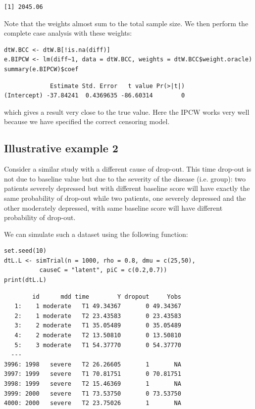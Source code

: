 \documentclass[12pt]{article}
\begin{document}
\begin{verbatim}
[1] 2045.06
\end{verbatim}


Note that the weights almost sum to the total sample size. We then
perform the complete case analysis with these weights:
\lstset{language=r,label= ,caption= ,captionpos=b,numbers=none}
\begin{lstlisting}
dtW.BCC <- dtW.B[!is.na(diff)]
e.BIPCW <- lm(diff~1, data = dtW.BCC, weights = dtW.BCC$weight.oracle)
summary(e.BIPCW)$coef
\end{lstlisting}

\begin{verbatim}
             Estimate Std. Error   t value Pr(>|t|)
(Intercept) -37.84241  0.4369635 -86.60314        0
\end{verbatim}


which gives a result very close to the true value. Here the IPCW works
very well because we have specified the correct censoring model.

\subsection{Illustrative example 2}
\label{sec:org8fd1238}

Consider a similar study with a different cause of drop-out. This time
drop-out is not due to baseline value but due to the severity of the
disease (i.e. group): two patients severely depressed but with
different baseline score will have exactly the same probability of
drop-out while two patients, one severely depressed and the other
moderately depressed, with same baseline score will have different
probability of drop-out.

\clearpage

We can simulate such a dataset using the following function:
\lstset{language=r,label= ,caption= ,captionpos=b,numbers=none}
\begin{lstlisting}
set.seed(10)
dtL.L <- simTrial(n = 1000, rho = 0.8, dmu = c(25,50),
		  causeC = "latent", piC = c(0.2,0.7))
print(dtL.L)
\end{lstlisting}

\begin{verbatim}
        id      mdd time        Y dropout     Yobs
   1:    1 moderate   T1 49.34367       0 49.34367
   2:    1 moderate   T2 23.43583       0 23.43583
   3:    2 moderate   T1 35.05489       0 35.05489
   4:    2 moderate   T2 13.50810       0 13.50810
   5:    3 moderate   T1 54.37770       0 54.37770
  ---                                             
3996: 1998   severe   T2 26.26605       1       NA
3997: 1999   severe   T1 70.81751       0 70.81751
3998: 1999   severe   T2 15.46369       1       NA
3999: 2000   severe   T1 73.53750       0 73.53750
4000: 2000   severe   T2 23.75026       1       NA
\end{verbatim}
\end{document}

